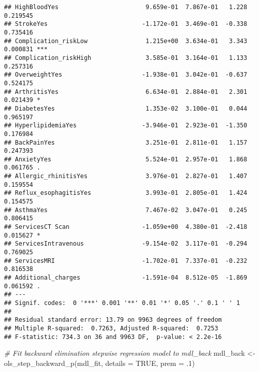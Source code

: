 \documentclass[
]{article}
\newenvironment{Shaded}{\begin{snugshade}}{\end{snugshade}}
\newcommand{\AttributeTok}[1]{\textcolor[rgb]{0.77,0.63,0.00}{#1}}
\newcommand{\CommentTok}[1]{\textcolor[rgb]{0.56,0.35,0.01}{\textit{#1}}}
\newcommand{\ConstantTok}[1]{\textcolor[rgb]{0.00,0.00,0.00}{#1}}
\newcommand{\DecValTok}[1]{\textcolor[rgb]{0.00,0.00,0.81}{#1}}
\newcommand{\FunctionTok}[1]{\textcolor[rgb]{0.00,0.00,0.00}{#1}}
\newcommand{\NormalTok}[1]{#1}
\newcommand{\OtherTok}[1]{\textcolor[rgb]{0.56,0.35,0.01}{#1}}
\begin{document}
\begin{verbatim}
## HighBloodYes                        9.659e-01  7.867e-01   1.228 0.219545    
## StrokeYes                          -1.172e-01  3.469e-01  -0.338 0.735416    
## Complication_riskLow                1.215e+00  3.634e-01   3.343 0.000831 ***
## Complication_riskHigh               3.585e-01  3.164e-01   1.133 0.257316    
## OverweightYes                      -1.938e-01  3.042e-01  -0.637 0.524175    
## ArthritisYes                        6.634e-01  2.884e-01   2.301 0.021439 *  
## DiabetesYes                         1.353e-02  3.100e-01   0.044 0.965197    
## HyperlipidemiaYes                  -3.946e-01  2.923e-01  -1.350 0.176984    
## BackPainYes                         3.251e-01  2.811e-01   1.157 0.247393    
## AnxietyYes                          5.524e-01  2.957e-01   1.868 0.061765 .  
## Allergic_rhinitisYes                3.976e-01  2.827e-01   1.407 0.159554    
## Reflux_esophagitisYes               3.993e-01  2.805e-01   1.424 0.154575    
## AsthmaYes                           7.467e-02  3.047e-01   0.245 0.806415    
## ServicesCT Scan                    -1.059e+00  4.380e-01  -2.418 0.015627 *  
## ServicesIntravenous                -9.154e-02  3.117e-01  -0.294 0.769025    
## ServicesMRI                        -1.702e-01  7.337e-01  -0.232 0.816538    
## Additional_charges                 -1.591e-04  8.512e-05  -1.869 0.061592 .  
## ---
## Signif. codes:  0 '***' 0.001 '**' 0.01 '*' 0.05 '.' 0.1 ' ' 1
## 
## Residual standard error: 13.79 on 9963 degrees of freedom
## Multiple R-squared:  0.7263, Adjusted R-squared:  0.7253 
## F-statistic: 734.3 on 36 and 9963 DF,  p-value: < 2.2e-16
\end{verbatim}

\begin{Shaded}
\begin{Highlighting}[]
\CommentTok{\# Fit backward elimination stepwise regression model to mdl\_back }
\NormalTok{mdl\_back }\OtherTok{\textless{}{-}} \FunctionTok{ols\_step\_backward\_p}\NormalTok{(mdl\_fit, }\AttributeTok{details =} \ConstantTok{TRUE}\NormalTok{, }\AttributeTok{prem =}\NormalTok{ .}\DecValTok{1}\NormalTok{)}
\end{Highlighting}
\end{Shaded}
\end{document}
